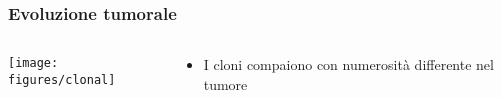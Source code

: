 \begin{frame}
\frametitle{Evoluzione tumorale}
\begin{columns}
\begin{column}{0.75\textwidth}
\centering
  \texttt{[image: figures/clonal]}
\end{column}
\begin{column}{0.25\textwidth}
\begin{itemize}
\item I cloni compaiono con numerosità differente nel tumore
\end{itemize}
\end{column}
\end{columns}
\end{frame}


\def\mut#1#2{%
\begin{scope}[shift={#1}]
\node[thick,draw,fill=blue!70,circle, scale=3.5] (#2) {};
\end{scope}
}

\def\muta#1#2{%
\begin{scope}[shift={#1}]
\mut{(0,0)}{#2};
\draw[fill=white] (0,0) circle (.1);
\end{scope}
}

\def\mutb#1#2{%
\begin{scope}[shift={#1}]
\muta{(0,0)}{#2};
\node[fill,color=brown,star, star points=6,scale=0.75] at (45:0.3) {};
\end{scope}
}

\def\mutc#1#2{%
\begin{scope}[shift={#1}]
\muta{(0,0)}{#2};
\node[fill,color=green,regular polygon, regular polygon sides=3,scale=0.65] at (90:0.3) {};
\end{scope}
}

\def\mutd#1#2{%
\begin{scope}[shift={#1}]
\mutc{(0,0)}{#2};
\node[fill,color=red,regular polygon, regular polygon sides=4,scale=0.75] at (0:0.3) {};
\end{scope}
}

\def\mute#1#2{%
\begin{scope}[shift={#1}]
\mutd{(0,0)}{#2};
\node[draw,cross out, draw=pink, very thick,scale=.8] at (180:.3) {};
\end{scope}
}

\def\mutf#1#2{%
\begin{scope}[shift={#1}]
\mutd{(0,0)}{#2};
\node[draw,diamond,scale=0.6, fill,color=blue]  at (270:0.3) {};
\end{scope}
}

